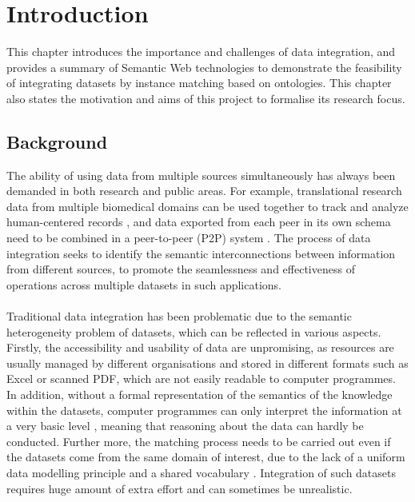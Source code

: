 \chapter{Introduction}

This chapter introduces the importance and challenges of data integration, and provides a summary of Semantic Web technologies to demonstrate the feasibility of integrating datasets by instance matching based on ontologies. This chapter also states the motivation and aims of this project to formalise its research focus.


\section{Background}

The ability of using data from multiple sources simultaneously has always been demanded in both research and public areas. For example, translational research data from multiple biomedical domains can be used together to track and analyze human-centered records \cite{DBLP:journals/jbi/WangLFCOHSO09}, and data exported from each peer in its own schema need to be combined in a peer-to-peer (P2P) system \cite{DBLP:conf/dbisp2p/CalvaneseDGLR03}. The process of data integration seeks to identify the semantic interconnections between information from different sources, to promote the seamlessness and effectiveness of operations across multiple datasets in such applications.
\\\\
Traditional data integration has been problematic due to the semantic heterogeneity problem of datasets, which can be reflected in various aspects. Firstly, the accessibility and usability of data are unpromising, as resources are usually managed by different organisations and stored in different formats such as Excel or scanned PDF, which are not easily readable to computer programmes. In addition, without a formal representation of the semantics of the knowledge within the datasets, computer programmes can only interpret the information at a very basic level \cite{DBLP:journals/expert/ShadboltBH06}, meaning that reasoning about the data can hardly be conducted. Further more, the matching process needs to be carried out even if the datasets come from the same domain of interest, due to the lack of a uniform data modelling principle and a shared vocabulary \cite{euzenat2013d}. Integration of such datasets requires huge amount of extra effort and can sometimes be unrealistic.

